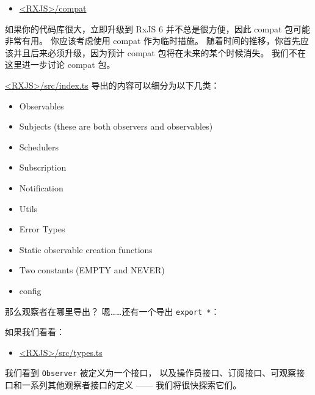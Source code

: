 \begin{itemize}
  \item \href{https://github.com/ReactiveX/rxjs/tree/master/compat}
        {<RXJS>/compat}
\end{itemize}


如果你的代码库很大，立即升级到 RxJS 6 并不总是很方便，因此 compat 包可能非常有用。
你应该考虑使用 compat 作为临时措施。
随着时间的推移，你首先应该并且后来必须升级，因为预计 compat 包将在未来的某个时候消失。
我们不在这里进一步讨论 compat 包。


\href{https://github.com/ReactiveX/rxjs/blob/master/src/index.ts}
{<RXJS>/src/index.ts}
导出的内容可以细分为以下几类：

\begin{itemize}
  \item Observables
  \item Subjects (these are both observers and observables)
  \item Schedulers
  \item Subscription
  \item Notification
  \item Utils
  \item Error Types
  \item Static observable creation functions
  \item Two constants (EMPTY and NEVER)
  \item config
\end{itemize}


那么观察者在哪里导出？ 嗯……还有一个导出 \texttt{export *}：




如果我们看看：

\begin{itemize}
  \item \href{https://github.com/ReactiveX/rxjs/blob/master/src/internal/types.ts}
        {<RXJS>/src/types.ts}
\end{itemize}


我们看到 \texttt{Observer} 被定义为一个接口，
以及操作员接口、订阅接口、可观察接口和一系列其他观察者接口的定义 —— 我们将很快探索它们。
